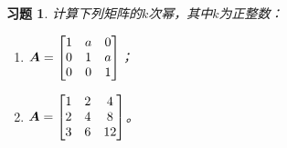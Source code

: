 \documentclass{ctexart}
\newtheorem{problem}{习题}[section]
\begin{document}
\setcounter{problem}{21}
\begin{problem}
计算下列矩阵的\(k\)次幂，其中\(k\)为正整数：

\begin{enumerate}
    \item \(\boldsymbol{A}=\begin{bmatrix}1&a&0\\0&1&a\\0&0&1\end{bmatrix}\)；
    \item \(\boldsymbol{A}=\begin{bmatrix}1&2&4\\2&4&8\\3&6&12\end{bmatrix}\)。
\end{enumerate}
\end{problem}
\end{document}

